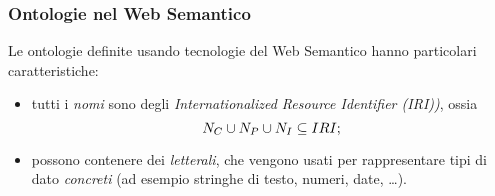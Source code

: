 \documentclass[8pt]{beamer}
\begin{document}
\begin{frame}
\frametitle{Ontologie nel Web Semantico}

Le ontologie definite usando tecnologie del Web Semantico hanno particolari
caratteristiche:

\begin{itemize}[<+->]
	\item tutti i \emph{nomi} sono degli \emph{Internationalized Resource
	Identifier (IRI))}, ossia
\[
 N_C \cup N_P \cup N_I \subseteq IRI ;
\]
  \item possono contenere dei \emph{letterali}, che vengono usati per
  rappresentare tipi di dato \emph{concreti} (ad esempio stringhe di testo, numeri, date,
  \ldots).
\end{itemize}

\end{frame}

% 

% 
% 
% 
\end{document}
